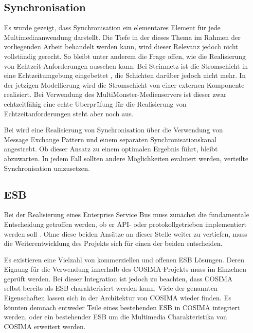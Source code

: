 
\subsection{Synchronisation} %
\label{sub:synchronisation}

  Es wurde gezeigt, dass Synchronisation ein elementares Element für jede Multimediaanwendung darstellt. Die Tiefe in der dieses Thema im Rahmen der vorliegenden Arbeit behandelt werden kann, wird dieser Relevanz jedoch nicht vollständig gerecht. So bleibt unter anderem die Frage offen, wie die Realisierung von Echtzeit-Anforderungen aussehen kann. Bei Steinmetz ist die Stromschicht in eine Echtzeitumgebung eingebettet \citep[S. 604]{multimedia_technologie}, die Schichten darüber jedoch nicht mehr. In der jetzigen Modellierung wird die Stromschicht von einer externen Komponente realisiert. Bei Verwendung des MultiMonster-Medienservers ist dieser zwar echtzeitfähig eine echte Überprüfung für die Realisierung von Echtzeitanforderungen steht aber noch aus.
  
  Bei \citep{antons09} wird eine Realisierung von Synchronisation über die Verwendung von Message Exchange Pattern und einem separaten Synchronisationskanal angestrebt. Ob dieser Ansatz zu einem optimalen Ergebnis führt, bleibt abzuwarten. In jedem Fall sollten andere Möglichkeiten evaluiert werden, verteilte Synchronisation umzusetzen.


\subsection{ESB} %
\label{sub:esb_fragen}

  Bei der Realisierung eines Enterprise Service Bus muss zunächst die fundamentale Entscheidung getroffen werden, ob er API- oder protokollgetrieben implementiert werden soll \citep[S. 59]{soa_in_practice}. Ohne diese beiden Ansätze an dieser Stelle weiter zu vertiefen, muss die Weiterentwicklung des Projekts sich für einen der beiden entscheiden.
  
  Es existieren eine Vielzahl von kommerziellen und offenen ESB Lösungen. Deren Eignung für die Verwendung innerhalb des COSIMA-Projekts muss im Einzelnen geprüft werden. Bei dieser Integration ist jedoch zu beachten, dass COSIMA selbst bereits als ESB charakterisiert werden kann. Viele der genannten Eigenschaften lassen sich in der Architektur von COSIMA wieder finden. Es könnten demnach entweder Teile eines bestehenden ESB in COSIMA integriert werden, oder ein bestehender ESB um die Multimedia Charakteristika von COSIMA erweitert werden.



